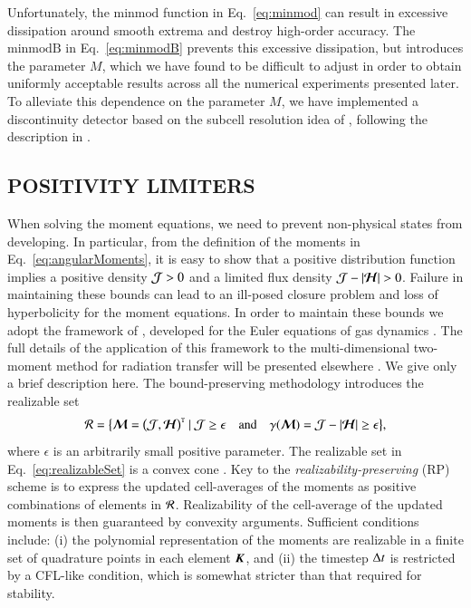 \documentclass[11pt,letterpaper,twoside,english,final]{article}
\begin{document}
Unfortunately, the $\text{minmod}$ function in Eq.~\eqref{eq:minmod} can result in excessive dissipation around smooth extrema and destroy high-order accuracy.  
The $\text{minmodB}$ in Eq.~\eqref{eq:minmodB} prevents this excessive dissipation, but introduces the parameter $M$, which we have found to be difficult to adjust in order to obtain uniformly acceptable results across all the numerical experiments presented later.  
To alleviate this dependence on the parameter $M$, we have implemented a discontinuity detector based on the subcell resolution idea of \citet{harten_1989}, following the description in \citet{qiuShu_2005}.  

\subsection{POSITIVITY LIMITERS}
\label{sec:positivityLimiters}

When solving the moment equations, we need to prevent non-physical states from developing.  
In particular, from the definition of the moments in Eq.~\eqref{eq:angularMoments}, it is easy to show that a positive distribution function implies a positive density $\mathcal{J}>0$ and a limited flux density $\cJ-|\bcH|>0$.  
Failure in maintaining these bounds can lead to an ill-posed closure problem and loss of hyperbolicity for the moment equations.  
In order to maintain these bounds we adopt the framework of \citet{ZS2010b}, developed for the Euler equations of gas dynamics \citep[see also][]{ZS2010a,ZS2011,OHF2012}.  
The full details of the application of this framework to the multi-dimensional two-moment method for radiation transfer will be presented elsewhere \citep{endeveHauck_2017}.  
We give only a brief description here.  
The bound-preserving methodology introduces the realizable set
\begin{equation}
  \mathcal{R}=\big\{\boldsymbol{\mathcal{M}}=\big(\mathcal{J},\boldsymbol{\mathcal{H}}\big)^{\mbox{\tiny T}}~|~\mathcal{J}\ge\epsilon\quad\text{and}\quad\gamma(\boldsymbol{\mathcal{M}})=\mathcal{J}-|\boldsymbol{\mathcal{H}}|\ge\epsilon\big\},
  \label{eq:realizableSet}
\end{equation}
where $\epsilon$ is an arbitrarily small positive parameter.  
The realizable set in Eq.~\eqref{eq:realizableSet} is a convex cone \citep{OHF2012}.  
Key to the \emph{realizability-preserving} (RP) scheme is to express the updated cell-averages of the moments as positive combinations of elements in $\mathcal{R}$.  
Realizability of the cell-average of the updated moments is then guaranteed by convexity arguments.  
Sufficient conditions include: (i) the polynomial representation of the moments are realizable in a finite set of quadrature points in each element $\boldsymbol{K}$, and (ii) the timestep $\Delta t$ is restricted by a CFL-like condition, which is somewhat stricter than that required for stability.  
\end{document}
